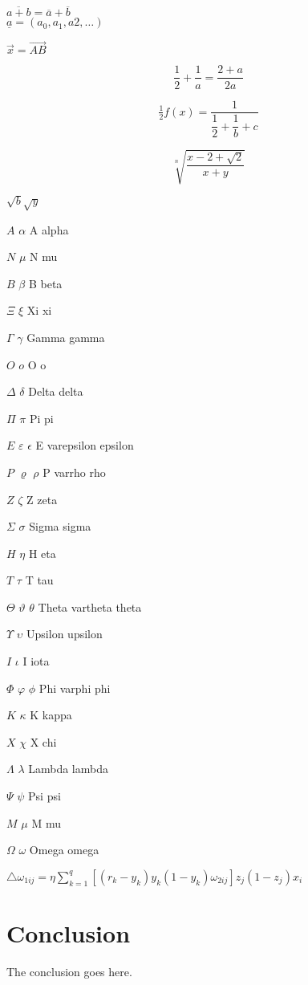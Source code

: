 \documentclass[10pt,journal,compsoc]{IEEEtran}
\begin{document}
	$\overline{a+b} = \overline a + \overline b$\\$\underline a =(a_0, a_1, a2, \dots)$



	$\vec x = \overrightarrow{AB}$

	\[\frac 12 +\frac 1a =\frac{2+a}{2a} \]

	\[\tfrac 12 f(x)=\frac{1}{\dfrac 12 + \dfrac 1b +c}
	\]

	\[\sqrt[n] {\frac{x-2 + \sqrt 2}{x+y}} \]

	$\sqrt b \sqrt y$ \qquad


	
	$A$ $\alpha$	A alpha		
	
	$N$ $\mu$	N mu
	
	$B$ $\beta$	B beta		
	
	$\Xi$ $\xi$	Xi xi
	
	$\Gamma$ $\gamma$	Gamma gamma		
	
	$O$ $o$	O o
	
	$\Delta$ $\delta$	Delta delta		
	
	$\Pi$ $\pi$	Pi pi
	
	$E$ $\varepsilon$ $\epsilon$	E varepsilon epsilon		
	
	$P$ $\varrho$ $\rho$	P varrho rho
	
	$Z$ $\zeta$	Z zeta		
	
	$\Sigma$ $\sigma$	Sigma sigma
	
	$H$ $\eta$	H eta		
	
	$T$ $\tau$	T tau
	
	$\Theta$ $\vartheta$ $\theta$	Theta vartheta theta		
	
	$\Upsilon$ $\upsilon$	Upsilon upsilon
	
	$I$ $\iota$	I iota		
	
	$\Phi$ $\varphi$ $\phi$	Phi varphi phi
	
	$K$ $\kappa$	K kappa		
	
	$X$ $\chi$	X chi
	
	$\Lambda$ $\lambda$	Lambda lambda	
	
	$\Psi$ $\psi$	Psi psi
	
	$M$ $\mu$	M mu		
	
	$\Omega$ $\omega$	Omega omega
	
	
	$\triangle \omega_{1ij}=\eta\sum_{k=1}^q{[(r_k-y_k)y_k(1-y_k)\omega_{2ij}]z_j(1-z_j)x_i}$

	\section{Conclusion}
	The conclusion goes here.
\end{document}
